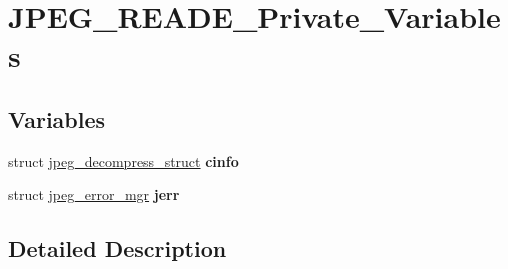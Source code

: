 \hypertarget{group___j_p_e_g___r_e_a_d_e___private___variables}{}\section{J\+P\+E\+G\+\_\+\+R\+E\+A\+D\+E\+\_\+\+Private\+\_\+\+Variables}
\label{group___j_p_e_g___r_e_a_d_e___private___variables}
\subsection*{Variables}
\begin{DoxyCompactItemize}
\item 
\mbox{\label{group___j_p_e_g___r_e_a_d_e___private___variables_ga93c39dd8f38d37bfb5197af63d28afb8}} 
struct \hyperlink{structjpeg__decompress__struct}{jpeg\+\_\+decompress\+\_\+struct} {\bfseries cinfo}
\item 
\mbox{\label{group___j_p_e_g___r_e_a_d_e___private___variables_ga45811748d45af97d5fb6cb2417563e57}} 
struct \hyperlink{structjpeg__error__mgr}{jpeg\+\_\+error\+\_\+mgr} {\bfseries jerr}
\end{DoxyCompactItemize}


\subsection{Detailed Description}
